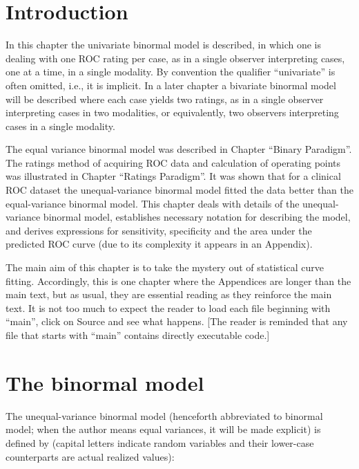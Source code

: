 \documentclass[
]{book}
\begin{document}
\hypertarget{BinModIntro}{%
\section{Introduction}\label{BinModIntro}}

In this chapter the univariate binormal model \citep{RN212} is described, in which one is dealing with one ROC rating per case, as in a single observer interpreting cases, one at a time, in a single modality. By convention the qualifier ``univariate'' is often omitted, i.e., it is implicit. In a later chapter a bivariate binormal model will be described where each case yields two ratings, as in a single observer interpreting cases in two modalities, or equivalently, two observers interpreting cases in a single modality.

The equal variance binormal model was described in Chapter ``Binary Paradigm''. The ratings method of acquiring ROC data and calculation of operating points was illustrated in Chapter ``Ratings Paradigm''. It was shown that for a clinical ROC dataset the unequal-variance binormal model fitted the data better than the equal-variance binormal model. This chapter deals with details of the unequal-variance binormal model, establishes necessary notation for describing the model, and derives expressions for sensitivity, specificity and the area under the predicted ROC curve (due to its complexity it appears in an Appendix).

The main aim of this chapter is to take the mystery out of statistical curve fitting. Accordingly, this is one chapter where the Appendices are longer than the main text, but as usual, they are essential reading as they reinforce the main text. It is not too much to expect the reader to load each file beginning with ``main'', click on Source and see what happens. {[}The reader is reminded that any file that starts with ``main'' contains directly executable code.{]}

\hypertarget{BinModTheModel}{%
\section{The binormal model}\label{BinModTheModel}}

The unequal-variance binormal model (henceforth abbreviated to binormal model; when the author means equal variances, it will be made explicit) is defined by (capital letters indicate random variables and their lower-case counterparts are actual realized values):
\end{document}
